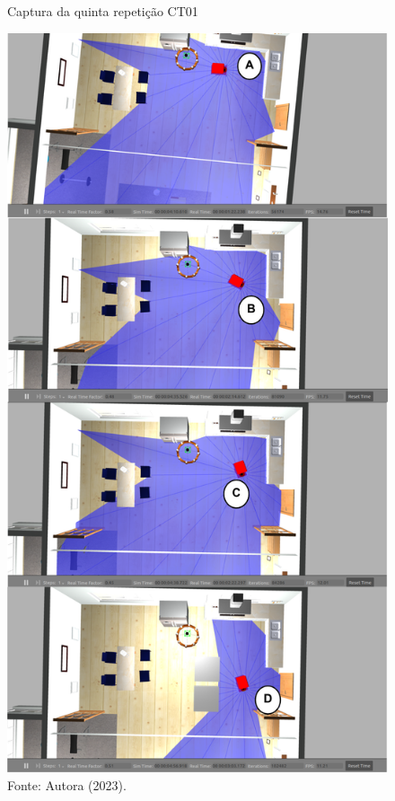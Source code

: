 \begin{figure}[H]
    \centering
    \caption{Captura da quinta repetição CT01}
    \includegraphics[scale=0.35]{ct01_5.png}
    \caption*{Fonte: Autora (2023).}
    \label{fig:ct01_5}
\end{figure}


